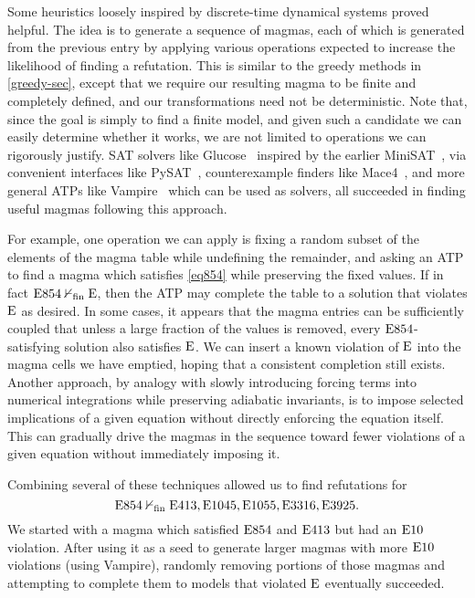  Some heuristics loosely inspired by discrete-time dynamical systems proved helpful.
 The idea is to generate a sequence of magmas, each of which is generated from the previous entry by applying various operations expected to increase the likelihood of
 finding a refutation.  This is similar to the greedy methods in \ref{greedy-sec}, except that we require our resulting magma to be finite and completely
 defined, and our transformations need not be deterministic.  Note that, since the goal is simply to find a finite model, and given such a candidate we can easily
 determine whether it works, we are not limited to operations we can rigorously justify.  SAT solvers like
 Glucose~\cite{DBLP:conf/ijcai/AudemardS09,DBLP:conf/cp/AudemardS12} inspired by the earlier MiniSAT~\cite{DBLP:conf/sat/EenS03},
 via convenient interfaces like PySAT~\cite{imms-sat18, itk-sat24}, counterexample finders like Mace4~\cite{prover9-mace4}, and more general ATPs like
 Vampire~\cite{DBLP:conf/cav/KovacsV13} which can be used as solvers, all succeeded in finding useful magmas following this approach.

 For example, one operation we can apply is fixing a random subset of the elements of the magma table while undefining the remainder,
 and asking an ATP to find a magma which satisfies \eqref{eq854} while preserving the fixed values.
 If in fact $\mathrm{E}854 \nvdash_{\mathrm{fin}} \mathrm{E}$, then the ATP may complete the table to a solution that violates $\mathrm{E}$ as desired.  In some cases,
 it appears that the magma entries can be sufficiently coupled that unless a large fraction of the values is removed,
 every $\mathrm{E}854$-satisfying solution also satisfies $\mathrm{E}$.
 We can insert a known violation of $\mathrm{E}$ into the magma cells we have emptied, hoping that a consistent completion still exists.
 Another approach, by analogy with slowly introducing forcing terms into numerical integrations while preserving adiabatic invariants, is to impose selected
 implications of a given equation without directly enforcing the equation itself.  This can gradually drive the magmas in the
 sequence toward fewer violations of a given equation without immediately imposing it.

Combining several of these techniques allowed us to find refutations for
$$\mathrm{E}854 \nvdash_{\mathrm{fin}} \mathrm{E}413, \mathrm{E}1045, \mathrm{E}1055, \mathrm{E}3316, \mathrm{E}3925.$$
 We started with a magma which satisfied $\mathrm{E}854$ and $\mathrm{E}413$ but had an $\mathrm{E}10$ violation.
After using it as a seed to generate larger magmas with more $\mathrm{E}10$ violations (using Vampire),
randomly removing portions of those magmas and attempting to complete them to models that violated $\mathrm{E}$ eventually succeeded.

